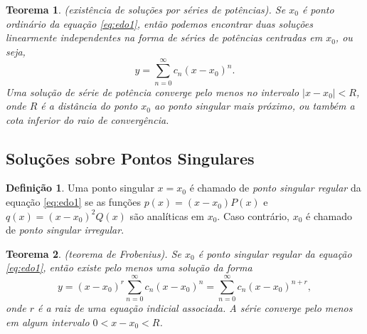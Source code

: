 \documentclass{article}
\theoremstyle{plain}
\newtheorem{thm}{Teorema}[section]
\theoremstyle{definition}
\newtheorem{defn}{Definição}[section]
\theoremstyle{remark}
\begin{document}
\begin{thm} (existência de soluções por séries de potências).
    Se \(x_0\) é ponto ordinário da equação \eqref{eq:edo1}, então podemos encontrar duas soluções linearmente independentes na forma de séries de potências centradas em \(x_0\), ou seja,
    \[
    y = \sum_{n=0}^{\infty} c_n (x - x_0)^n.
    \]
    Uma solução de série de potência converge pelo menos no intervalo \(|x - x_0| < R\), onde \(R\) é a distância do ponto \(x_0\) ao ponto singular mais próximo, ou também a \emph{cota inferior} do raio de convergência.
\end{thm}

\subsection{Soluções sobre Pontos Singulares}

\begin{defn}
    Uma ponto singular \(x=x_0\) é chamado de \emph{ponto singular regular} da equação \eqref{eq:edo1} se as funções \(p(x)=(x-x_0)P(x)\) e \(q(x)=(x-x_0)^2Q(x)\) são analíticas em \(x_0\). Caso contrário, \(x_0\) é chamado de \emph{ponto singular irregular}.
\end{defn}

\begin{thm} (teorema de Frobenius).
    Se \(x_0\) é ponto singular regular da equação \eqref{eq:edo1}, então existe pelo menos uma solução da forma
    \begin{equation}
        y = (x - x_0)^r \sum_{n=0}^{\infty} c_n (x - x_0)^n = \sum_{n=0}^{\infty} c_n (x - x_0)^{n+r},
    \end{equation}
    \noindent onde \(r\) é a raiz de uma equação indicial associada. A série converge pelo menos em algum intervalo \(0<x-x_0<R\).
\end{thm}
\end{document}
